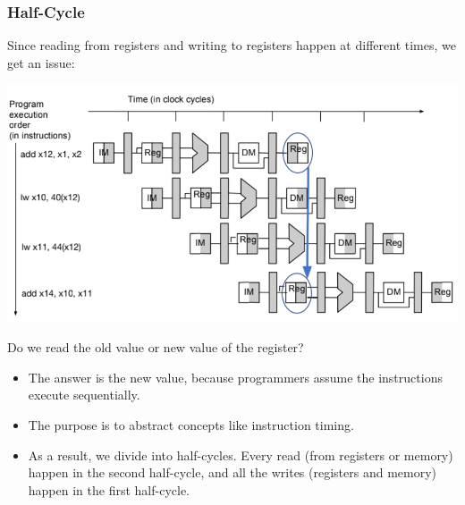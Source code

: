 \documentclass[10pt]{article}
\begin{document}
\subsubsection*{Half-Cycle}
Since reading from registers and writing to registers happen at different times, we get an issue:
\begin{center}
    \includegraphics*[scale=0.8]{W3_6.png}
\end{center}
Do we read the old value or new value of the register?
\begin{itemize}
    \item The answer is the new value, because programmers assume the instructions execute sequentially.
    \item The purpose is to abstract concepts like instruction timing.
    \item As a result, we divide into half-cycles.  Every read (from registers or memory) happen in the second half-cycle, and all the writes (registers and memory) happen in the first half-cycle.
\end{itemize}
\end{document}
